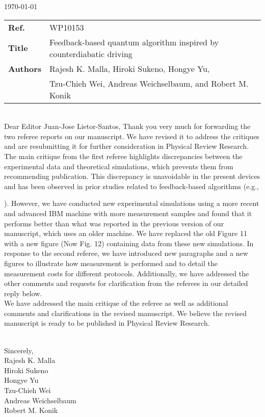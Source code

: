\documentclass[groupedaddress,prx,floats,superscriptaddress,notitlepages,12pt]{revtex4-2}
\renewcommand*{\cite}[1]{\begin{NoHyper}[\citenum{#1}]\end{NoHyper}}
\begin{document}
\setcounter{page}{0}
\thispagestyle{empty}

\noindent \hfill\today\\[4ex]

\noindent
\begin{tabular}{p{0.75in}l}
{\bf Ref.} & WP10153 \\
{\bf Title} & Feedback-based quantum algorithm inspired by counterdiabatic driving \\
{\bf Authors}  & Rajesh K. Malla, Hiroki Sukeno, Hongye Yu, \\ &
Tzu-Chieh Wei, Andreas Weichselbaum, and Robert M. Konik
\end{tabular}

\noindent\\[4ex]
Dear Editor Juan-Jose Lietor-Santos,
\vskip 10pt
\noindent Thank you very much for forwarding the two referee reports on our manuscript. We have revised it to address the critiques and are resubmitting it for further consideration in Physical Review Research.
\\

\noindent 
The main critique from the first referee highlights discrepancies between the experimental data and theoretical simulations, which prevents them from recommending publication. This discrepancy is unavoidable in the present devices and has been observed in prior studies related to feedback-based algorithms (e.g., \cite{FeedbackPRL,FeedbackPRA}). However, we have conducted new experimental simulations using a more recent and advanced IBM machine
with more measurement samples 
and found that it performs better than what was reported in the previous version of our manuscript, which uses an older machine. We have replaced the old Figure 11 with a new figure (Now Fig. 12) containing data from these new simulations. In response to the second referee, we have introduced new paragraphs and a new figures to illustrate how measurement is performed and to detail the measurement costs for different protocols. Additionally, we have addressed the other comments and requests for clarification from the referees in our detailed reply below.
\\

\noindent We have addressed the main critique of the referee as well as additional comments and clarifications in the revised manuscript. We believe the revised manuscript is ready to be published in Physical Review Research.



\noindent  \\
Sincerely,
\noindent \\
Rajesh K. Malla \\
Hiroki Sukeno \\
Hongye Yu \\
Tzu-Chieh Wei \\
Andreas Weichselbaum \\
Robert M. Konik \\
\clearpage
\end{document}
